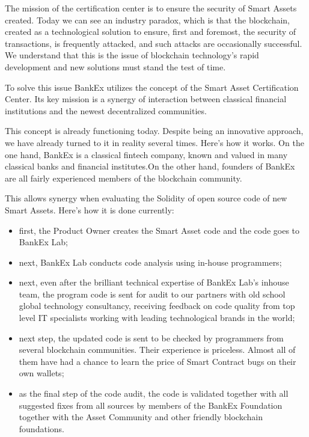 \documentclass{article}
\begin{document}
\begin{multicols}{2}
The mission of the certification center is to ensure the security of Smart Assets created. Today we can see an industry paradox, which is that the blockchain, created as a technological solution to ensure, first and foremost, the security of transactions, is frequently attacked, and such attacks are occasionally successful. We understand that this is the issue of blockchain technology's rapid development and new solutions must stand the test of time.

To solve this issue BankEx utilizes the concept of the Smart Asset Certification Center. Its key mission is a synergy of interaction between classical financial institutions and the newest decentralized communities.

This concept is already functioning today. Despite being an innovative approach, we have already turned to it in reality several times. Here's how it works. On the one hand, BankEx is a classical fintech company, known and valued in many classical banks and financial institutes.On the other hand, founders of BankEx are all fairly experienced members of the blockchain community. 

This allows synergy when evaluating the Solidity of open source code of new Smart Assets. Here's how it is done currently:

\begin{itemize}
\item first, the Product Owner creates the Smart Asset code and the code goes to BankEx Lab;
\item next, BankEx Lab conducts code analysis using in-house programmers;
\item next, even after the brilliant technical expertise of BankEx Lab's inhouse team, the program code is sent for audit to our partners with old school global technology consultancy, receiving feedback on code quality from top level IT specialists working with leading technological brands in the world; 
\item next step, the updated code is sent to be checked by programmers from several blockchain communities. Their experience is priceless. Almost all of them have had a chance to learn the price of Smart Contract bugs on their own wallets;
\item as the final step of the code audit, the code is validated together with all suggested fixes from all sources by members of the BankEx Foundation together with the Asset Community and other friendly blockchain foundations.
\end{itemize}


\end{multicols}
\end{document}
